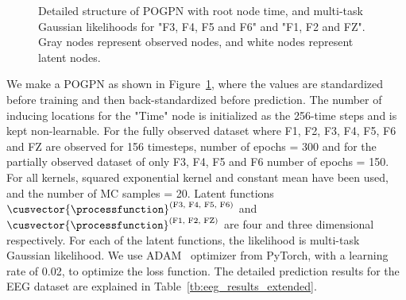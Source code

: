 \begin{figure}[h]
      \centering
      
      \caption{Detailed structure of POGPN with root node time, and multi-task Gaussian likelihoods for "F3, F4, F5 and F6" and "F1, F2 and FZ". Gray nodes represent observed nodes, and white nodes represent latent nodes.}
      \label{fig:eeg_dag_appendix}
\end{figure}

We make a POGPN as shown in Figure~\ref{fig:eeg_dag_appendix}, where the values are standardized before training and then back-standardized before prediction. The number of inducing locations for the "Time" node is initialized as the 256-time steps and is kept non-learnable. For the fully observed dataset where F1, F2, F3, F4, F5, F6 and FZ are observed for 156 timesteps, number of epochs = 300 and for the partially observed dataset of only F3, F4, F5 and F6 number of epochs = 150. For all kernels, squared exponential kernel and constant mean have been used, and the number of MC samples = 20. Latent functions $\cusvector{\processfunction}^{(\text{F3, F4, F5, F6})}$ and $\cusvector{\processfunction}^{(\text{F1, F2, FZ})}$ are four and three dimensional respectively. For each of the latent functions, the likelihood is multi-task Gaussian likelihood. We use ADAM~\citep{kingma2014adam} optimizer from PyTorch, with a learning rate of 0.02, to optimize the loss function. The detailed prediction results for the EEG dataset are explained in Table~\ref{tb:eeg_results_extended}.

